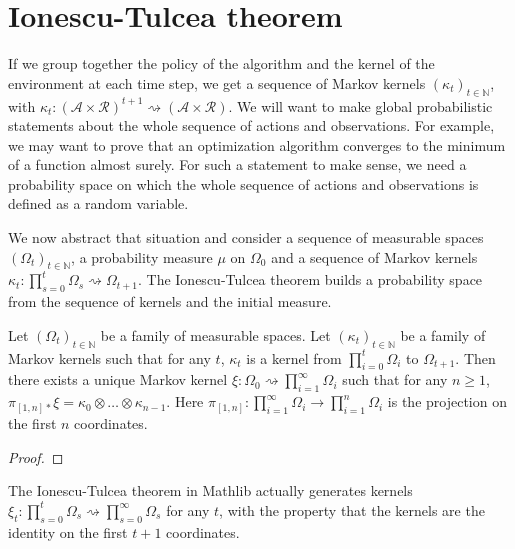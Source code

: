 \section{Ionescu-Tulcea theorem}

If we group together the policy of the algorithm and the kernel of the environment at each time step, we get a sequence of Markov kernels $(\kappa_t)_{t \in \mathbb{N}}$, with $\kappa_t : (\mathcal{A} \times \mathcal{R})^{t+1}  \rightsquigarrow (\mathcal{A} \times \mathcal{R})$.
We will want to make global probabilistic statements about the whole sequence of actions and observations.
For example, we may want to prove that an optimization algorithm converges to the minimum of a function almost surely.
For such a statement to make sense, we need a probability space on which the whole sequence of actions and observations is defined as a random variable.

We now abstract that situation and consider a sequence of measurable spaces $(\Omega_t)_{t \in \mathbb{N}}$, a probability measure $\mu$ on $\Omega_0$ and a sequence of Markov kernels $\kappa_t : \prod_{s=0}^t \Omega_s \rightsquigarrow \Omega_{t+1}$.
The Ionescu-Tulcea theorem builds a probability space from the sequence of kernels and the initial measure.

\begin{theorem}\label{thm:ionescu-tulcea}
  \mathlibok
Let $(\Omega_t)_{t \in \mathbb{N}}$ be a family of measurable spaces. Let $(\kappa_t)_{t \in \mathbb{N}}$ be a family of Markov kernels such that for any $t$, $\kappa_t$ is a kernel from $\prod_{i=0}^t \Omega_{i}$ to $\Omega_{t+1}$.
Then there exists a unique Markov kernel $\xi : \Omega_0 \rightsquigarrow \prod_{i = 1}^{\infty} \Omega_{i}$ such that for any $n \ge 1$,
$\pi_{[1,n]*} \xi = \kappa_0 \otimes \ldots \otimes \kappa_{n-1}$.
Here $\pi_{[1,n]} : \prod_{i=1}^{\infty} \Omega_i \to \prod_{i=1}^n \Omega_i$ is the projection on the first $n$ coordinates.
\end{theorem}

\begin{proof}\leanok
\end{proof}

The Ionescu-Tulcea theorem in Mathlib \cite{marion2025formalization} actually generates kernels $\xi_t : \prod_{s=0}^t \Omega_s \rightsquigarrow \prod_{s=0}^{\infty} \Omega_s$ for any $t$, with the property that the kernels are the identity on the first $t+1$ coordinates.

